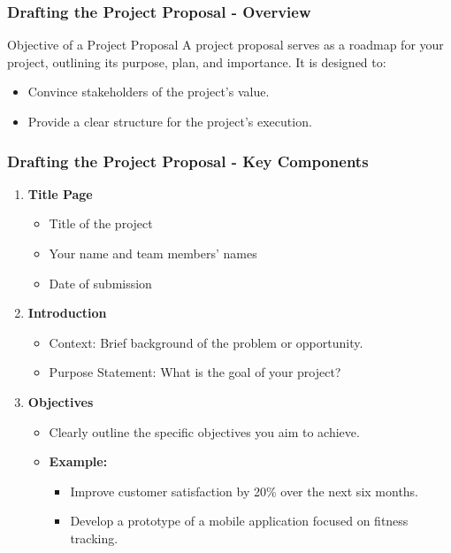 \documentclass[aspectratio=169]{beamer}
\begin{document}
\begin{frame}[fragile]
    \frametitle{Drafting the Project Proposal - Overview}
    \begin{block}{Objective of a Project Proposal}
        A project proposal serves as a roadmap for your project, outlining its purpose, plan, and importance. It is designed to:
        \begin{itemize}
            \item Convince stakeholders of the project's value.
            \item Provide a clear structure for the project's execution.
        \end{itemize}
    \end{block}
\end{frame}

\begin{frame}[fragile]
    \frametitle{Drafting the Project Proposal - Key Components}
    \begin{enumerate}
        \item \textbf{Title Page}
            \begin{itemize}
                \item Title of the project
                \item Your name and team members' names
                \item Date of submission
            \end{itemize}
        \item \textbf{Introduction}
            \begin{itemize}
                \item Context: Brief background of the problem or opportunity.
                \item Purpose Statement: What is the goal of your project?
            \end{itemize}
        \item \textbf{Objectives}
            \begin{itemize}
                \item Clearly outline the specific objectives you aim to achieve.
                \item \textbf{Example:}
                \begin{itemize}
                    \item Improve customer satisfaction by 20\% over the next six months.
                    \item Develop a prototype of a mobile application focused on fitness tracking.
                \end{itemize}
            \end{itemize}
    \end{enumerate}
\end{frame}
\end{document}
